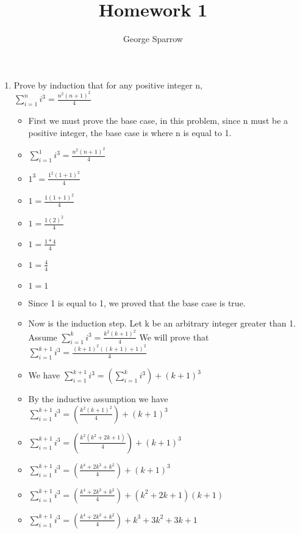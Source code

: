\documentclass{article}
\title{Homework 1}
\date{\mydate}
\author{George Sparrow}
\begin{document}
\maketitle
\newpage

\begin{enumerate}
\item Prove by induction that for any positive integer n, \\
  {\Large $\sum\limits_{i=1}^{n}i^{3}=\frac{n^{2}(n+1)^{2}}{4}$}
    \begin{itemize}
    \item [] First we must prove the base case, in this problem, since n must be a positive integer, the base case is where n is equal to 1.
    \item [] {\Large $\sum\limits_{i=1}^{1}i^{3}=\frac{n^{2}(n+1)^{2}}{4}$}
    \item [] {\Large $1^{3}=\frac{1^{2}(1+1)^{2}}{4}$}
    \item [] {\Large $1=\frac{1(1+1)^{2}}{4}$}
    \item [] {\Large $1=\frac{1(2)^{2}}{4}$}
    \item [] {\Large $1=\frac{1*4}{4}$}
    \item [] {\Large $1=\frac{4}{4}$}
    \item [] $1=1$
    \item Since 1 is equal to 1, we proved that the base case is true.
    \item Now is the induction step. Let k be an arbitrary integer greater than 1. Assume {\Large $\sum\limits_{i=1}^{k}i^{3}=\frac{k^{2}(k+1)^{2}}{4}$} We will prove that {\Large $\sum\limits_{i=1}^{k+1}i^{3}=\frac{(k+1)^{2}((k+1)+1)^{2}}{4}$}
    \item We have {\Large $\sum\limits_{i=1}^{k+1}i^{3}=\left( \sum\limits_{i=1}^{k}i^{3} \right) + (k+1)^{3}$}
    \item By the inductive assumption we have {\Large $\sum\limits_{i=1}^{k+1}i^{3}=\left(\frac{k^{2}(k+1)^{2}}{4} \right) + (k+1)^{3}$}
    \item {\Large $\sum\limits_{i=1}^{k+1}i^{3}=\left(\frac{k^{2}(k^{2}+2k+1)}{4} \right) + (k+1)^{3}$}
    \item {\Large $\sum\limits_{i=1}^{k+1}i^{3}=\left(\frac{k^{4}+2k^{3}+k^{2}}{4} \right) + (k+1)^{3}$}
    \item {\Large $\sum\limits_{i=1}^{k+1}i^{3}=\left(\frac{k^{4}+2k^{3}+k^{2}}{4} \right) + (k^{2}+2k+1)(k+1)$}
    \item {\Large $\sum\limits_{i=1}^{k+1}i^{3}=\left(\frac{k^{4}+2k^{3}+k^{2}}{4} \right) + k^{3}+3k^{2}+3k+1$}

\end{itemize}
\end{enumerate}
\end{document}
